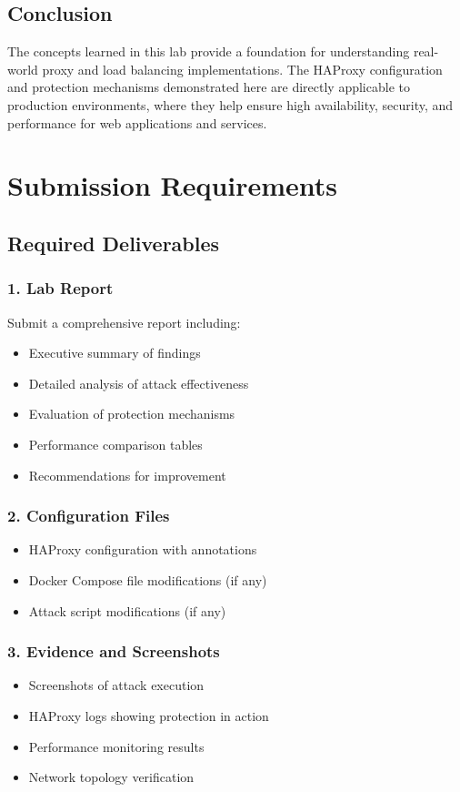 \documentclass[12pt]{article}
\begin{document}
\subsection{Conclusion}
The concepts learned in this lab provide a foundation for understanding real-world proxy and load balancing implementations. The HAProxy configuration and protection mechanisms demonstrated here are directly applicable to production environments, where they help ensure high availability, security, and performance for web applications and services.

\section{Submission Requirements}

\subsection{Required Deliverables}

\subsubsection{1. Lab Report}
Submit a comprehensive report including:
\begin{itemize}
    \item Executive summary of findings
    \item Detailed analysis of attack effectiveness
    \item Evaluation of protection mechanisms
    \item Performance comparison tables
    \item Recommendations for improvement
\end{itemize}

\subsubsection{2. Configuration Files}
\begin{itemize}
    \item HAProxy configuration with annotations
    \item Docker Compose file modifications (if any)
    \item Attack script modifications (if any)
\end{itemize}

\subsubsection{3. Evidence and Screenshots}
\begin{itemize}
    \item Screenshots of attack execution
    \item HAProxy logs showing protection in action
    \item Performance monitoring results
    \item Network topology verification
\end{itemize}
\end{document}
